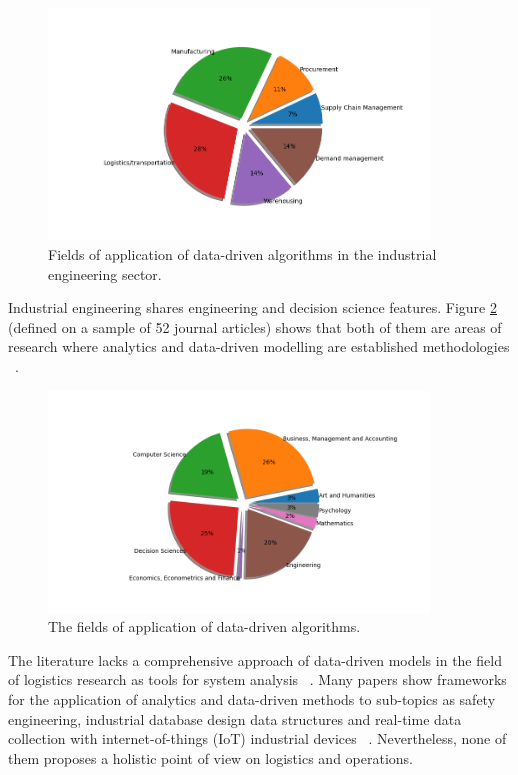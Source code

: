 \begin{figure}[hbt!]
\centering
\includegraphics[width=0.9\textwidth]{SectionIntroduction/researchBackground_figures/fig_literature_pie.png}
\captionsetup{type=figure}
\caption{Fields of application of data-driven algorithms in the industrial engineering sector.}
\label{fig_literature_pie}
\end{figure}

Industrial engineering shares engineering and decision science features. Figure \ref{fig_topics_pie} (defined on a sample of 52 journal articles) shows that both of them are areas of research where analytics and data-driven modelling are established methodologies ~\cite{Gupta2019}.

\begin{figure}[hbt!]
\centering
\includegraphics[width=0.9\textwidth]{SectionIntroduction/researchBackground_figures/fig_topics_pie.png}
\captionsetup{type=figure}
\caption{The fields of application of data-driven algorithms.}
\label{fig_topics_pie}
\end{figure}

The literature lacks a comprehensive approach of data-driven models in the field of logistics research as tools for system analysis ~\cite{Wang2016}. Many papers show frameworks for the application of analytics and data-driven methods to sub-topics as safety engineering, industrial database design data structures and real-time data collection with internet-of-things (IoT) industrial devices ~\cite{Huang2018, Zhang2018}. Nevertheless, none of them proposes a holistic point of view on logistics and operations.\par

